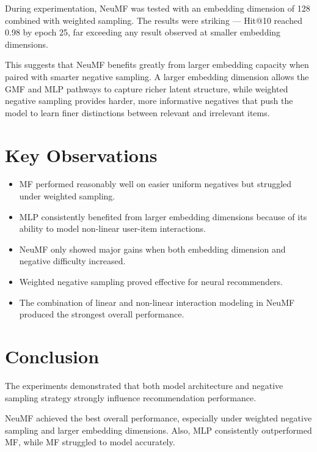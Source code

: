\documentclass{article}
\begin{document}
During experimentation, NeuMF was tested with an embedding dimension of 128 
combined with weighted sampling. The results were 
striking — Hit@10 reached 0.98 by epoch 25, far exceeding any result 
observed at smaller embedding dimensions.

This suggests that NeuMF benefits greatly from larger embedding 
capacity when paired with smarter negative sampling. A larger embedding 
dimension allows the GMF and MLP pathways to capture richer latent 
structure, while weighted negative sampling provides harder, more informative negatives that 
push the model to learn finer distinctions between relevant 
and irrelevant items.

\section{Key Observations}

\begin{itemize}
    \item MF performed reasonably well on easier uniform negatives but struggled under weighted sampling.
    
    \item MLP consistently benefited from larger embedding dimensions because of its ability to model non-linear user-item interactions.
    
    \item NeuMF only showed major gains when both embedding dimension and negative difficulty increased.
    
    \item Weighted negative sampling proved effective for neural recommenders.
    
    \item The combination of linear and non-linear interaction modeling in NeuMF produced the strongest overall performance.
\end{itemize}

\section{Conclusion}

The experiments demonstrated that both model architecture and negative sampling strategy strongly influence recommendation performance.

NeuMF achieved the best overall performance, especially under weighted negative sampling and larger embedding dimensions. Also, MLP consistently outperformed MF, while MF struggled to model accurately.
\end{document}
